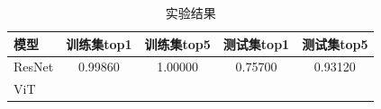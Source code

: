 \documentclass[12pt]{article}
\begin{document}
\begin{table}[h]
	\centering
	\begin{tabular}{|l|c|c|c|c|} 
		\hline
		模型 
		& 训练集top1 & 训练集top5 
		& 测试集top1 & 测试集top5\\
		\hline
		ResNet & 0.99860 & 1.00000 & 0.75700 & 0.93120 \\
		ViT &  &  &  &  \\
		\hline
	\end{tabular}
	\caption{实验结果}
	\label{tab:Classify}
\end{table}
	
\end{document}
